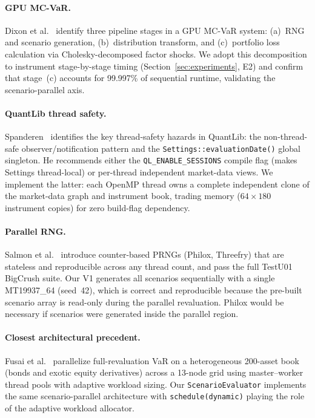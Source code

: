 \documentclass[11pt,twocolumn]{article}
\begin{document}
\paragraph{GPU MC-VaR.}
Dixon et al.~\cite{dixon2011} identify three pipeline stages in a
GPU MC-VaR system: (a)~RNG and scenario generation,
(b)~distribution transform, and (c)~portfolio loss calculation via
Cholesky-decomposed factor shocks.
We adopt this decomposition to instrument stage-by-stage timing
(Section~\ref{sec:experiments}, E2) and confirm that stage~(c)
accounts for 99.997\% of sequential runtime, validating
the scenario-parallel axis.

\paragraph{QuantLib thread safety.}
Spanderen~\cite{spanderen2013} identifies the key thread-safety
hazards in QuantLib: the non-thread-safe observer/notification pattern
and the \texttt{Settings::evaluationDate()} global singleton.
He recommends either the \texttt{QL\_ENABLE\_SESSIONS} compile flag
(makes Settings thread-local) or per-thread independent market-data
views.  We implement the latter: each OpenMP thread owns a complete
independent clone of the market-data graph and instrument book, trading
memory ($64\times180$ instrument copies) for zero build-flag
dependency.

\paragraph{Parallel RNG.}
Salmon et al.~\cite{salmon2011} introduce counter-based PRNGs
(Philox, Threefry) that are stateless and reproducible across any
thread count, and pass the full TestU01 BigCrush suite.
Our V1 generates all scenarios sequentially with a single
MT19937\_64 (seed~42), which is correct and reproducible because
the pre-built scenario array is read-only during the parallel
revaluation.  Philox would be necessary if scenarios were
generated inside the parallel region.

\paragraph{Closest architectural precedent.}
Fusai et al.~\cite{fusai2006} parallelize full-revaluation VaR on a
heterogeneous 200-asset book (bonds and exotic equity derivatives)
across a 13-node grid using master--worker thread pools with adaptive
workload sizing.  Our \texttt{ScenarioEvaluator} implements the same
scenario-parallel architecture with \texttt{schedule(dynamic)}
playing the role of the adaptive workload allocator.
\end{document}
